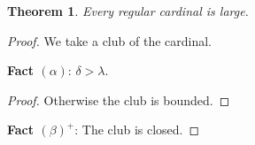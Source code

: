 \documentclass{article}
\newtheorem{theorem}{Theorem}
\newcommand{\sn}{\smallskip\noindent}
\begin{document}
\begin{theorem} Every regular cardinal is large. \end{theorem}
\begin{proof}
We take a club of the cardinal.

\sn
\textbf{Fact $(\alpha)$}: $\delta > \lambda$.

\begin{proof} Otherwise the club is bounded. \end{proof}

\sn
\textbf{Fact $(\beta)^+$}: The club is closed.
\end{proof}
\end{document}
